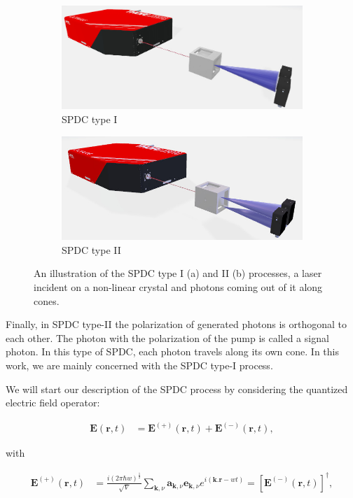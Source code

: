 \documentclass[12pt]{book}
\begin{document}
\begin{figure}[t!]
\centering
\begin{subfigure}[b]{0.45\linewidth}
\includegraphics[width=\linewidth,height=2.8 cm]{images/TypeI.jpg}
\caption{SPDC type I}
\label{fig:type1}
\end{subfigure}
\begin{subfigure}[b]{0.45\linewidth}
\includegraphics[width=\linewidth,height=2.8 cm]{images/typeII.jpg}
\caption{SPDC type II}
\label{fig:type2}
\end{subfigure}
\caption{An illustration of the SPDC type I (a) and II (b) processes, a laser incident on a non-linear crystal and photons coming out of it along cones.}
\label{fig:SPDC}
\end{figure}


Finally, in SPDC type-II the polarization of generated photons is orthogonal to each other. The photon with the polarization of the pump is called a signal photon. In this type of SPDC, each photon travels along its own cone. In this work, we are mainly concerned with the SPDC type-I process.

We will start our description of the SPDC process by considering the quantized electric field operator:

\begin{align}
\textbf{E}(\textbf{r},t)&=\textbf{E}^{(+)} (\textbf{r},t) + \textbf{E}^{(-)} (\textbf{r},t), \label{fiel+}
\end{align}

with

\begin{align}
\textbf{E}^{(+)} (\textbf{r},t)&=\frac{i(2 \pi \hbar w)^{\frac{1}{2}}}{\sqrt{V}} \sum_{\textbf{k},\nu}  \mathbf{a}_{\textbf{k},\nu} \mathbf{e}_{\textbf{k},\nu} e^{i(\textbf{k.r}-wt)}=[\textbf{E}^{(-)} (\textbf{r},t)]^{\dagger}, \label{quanfield}
\end{align}
\end{document}
